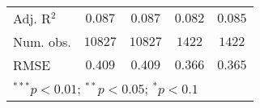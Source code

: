 \begin{table}
\begin{center}
\begin{tabular}{l c c c c}
Adj. R$^2$              & $0.087$        & $0.087$        & $0.082$        & $0.085$        \\
Num. obs.               & $10827$        & $10827$        & $1422$         & $1422$         \\
RMSE                    & $0.409$        & $0.409$        & $0.366$        & $0.365$        \\
\bottomrule
\multicolumn{5}{l}{\scriptsize{$^{***}p<0.01$; $^{**}p<0.05$; $^{*}p<0.1$}}
\end{tabular}
\label{table_school_month}
\end{center}
\end{table}
